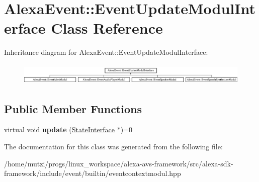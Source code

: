 \hypertarget{classAlexaEvent_1_1EventUpdateModulInterface}{}\section{Alexa\+Event\+:\+:Event\+Update\+Modul\+Interface Class Reference}
\label{classAlexaEvent_1_1EventUpdateModulInterface}
Inheritance diagram for Alexa\+Event\+:\+:Event\+Update\+Modul\+Interface\+:\begin{figure}[H]
\begin{center}
\leavevmode
\includegraphics[height=1.052632cm]{da/d05/classAlexaEvent_1_1EventUpdateModulInterface}
\end{center}
\end{figure}
\subsection*{Public Member Functions}
\begin{DoxyCompactItemize}
\item 
\mbox{\label{classAlexaEvent_1_1EventUpdateModulInterface_adbcd39847de2684672d4586f774dc920}} 
virtual void {\bfseries update} (\hyperlink{classAlexaEvent_1_1StateInterface}{State\+Interface} $\ast$)=0
\end{DoxyCompactItemize}


The documentation for this class was generated from the following file\+:\begin{DoxyCompactItemize}
\item 
/home/mutzi/progs/linux\+\_\+workspace/alexa-\/avs-\/framework/src/alexa-\/sdk-\/framework/include/event/builtin/eventcontextmodul.\+hpp\end{DoxyCompactItemize}
